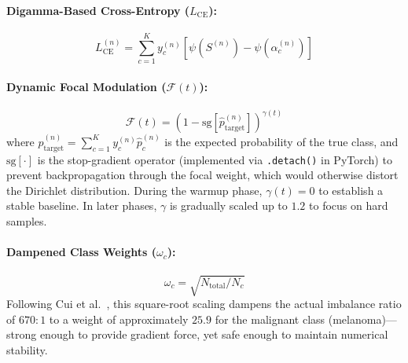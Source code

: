\documentclass[11pt, a4paper]{article}
\begin{document}
\paragraph{Digamma-Based Cross-Entropy ($L_{\text{CE}}$):}
\begin{equation}
    L_{\text{CE}}^{(n)} = \sum_{c=1}^K y_c^{(n)} \left[\psi(S^{(n)}) - \psi(\alpha_c^{(n)})\right]
\end{equation}

\paragraph{Dynamic Focal Modulation ($\mathcal{F}(t)$):}
\begin{equation}
    \mathcal{F}(t) = \left(1 - \text{sg}[\hat{p}_{\text{target}}^{(n)}]\right)^{\gamma(t)}
\end{equation}
where $\hat{p}_{\text{target}}^{(n)} = \sum_{c=1}^K y_c^{(n)} \hat{p}_c^{(n)}$ is the expected probability of the true class, and $\text{sg}[\cdot]$ is the stop-gradient operator (implemented via \texttt{.detach()} in PyTorch) to prevent backpropagation through the focal weight, which would otherwise distort the Dirichlet distribution. During the warmup phase, $\gamma(t) = 0$ to establish a stable baseline. In later phases, $\gamma$ is gradually scaled up to $1.2$ to focus on hard samples.

\paragraph{Dampened Class Weights ($\omega_c$):}
\begin{equation}\label{eq:class_weights}
    \omega_c = \sqrt{N_{\text{total}} / N_c}
\end{equation}
Following Cui et al.~\cite{cui2019class}, this square-root scaling dampens the actual imbalance ratio of $670{:}1$ to a weight of approximately $25.9$ for the malignant class (melanoma)---strong enough to provide gradient force, yet safe enough to maintain numerical stability.
\end{document}
